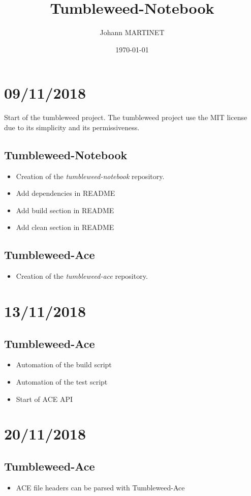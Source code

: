 

\title{Tumbleweed-Notebook}
\author{Johann MARTINET}
\date{\today}


\maketitle

\section*{09/11/2018}%
\label{sec:09_11_2018}

Start of the tumbleweed project.
The tumbleweed project use the MIT license due to its simplicity and its permissiveness.

\subsection*{Tumbleweed-Notebook}%
\begin{itemize}
        \item Creation of the \emph{tumbleweed-notebook} repository.
        \item Add dependencies in README
        \item Add build section in README
        \item Add clean section in README
\end{itemize}

\subsection*{Tumbleweed-Ace}%
\begin{itemize}
        \item Creation of the \emph{tumbleweed-ace} repository.
\end{itemize}

\section*{13/11/2018}%
\label{sec:13_11_2018}

\subsection*{Tumbleweed-Ace}%
\begin{itemize}
        \item Automation of the build script
        \item Automation of the test script
        \item Start of ACE API
\end{itemize}

\section*{20/11/2018}%
\label{sec:20_11_2018}

\subsection*{Tumbleweed-Ace}%
\label{sub:tumbleweed_ace}

\begin{itemize}
        \item ACE file headers can be parsed with Tumbleweed-Ace
\end{itemize}

